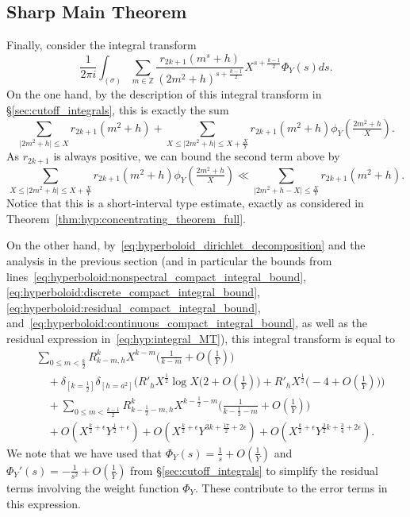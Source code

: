 \subsection{Sharp Main Theorem}


Finally, consider the integral transform
\begin{equation}
  \frac{1}{2\pi i} \int_{(\sigma)} \sum_{m \in \mathbb{Z}} \frac{r_{2k+1}{(m^s +
  h)}}{(2m^2 + h)^{s + \frac{k-1}{2}}} X^{s + \frac{k-1}{2}} \Phi_Y(s) ds.
\end{equation}
On the one hand, by the description of this integral transform in
\S\ref{sec:cutoff_integrals}, this is exactly the sum
\begin{equation}\label{eq:hyp:sharp_main_estimate_I}
  \sum_{\lvert 2m^2 + h \rvert \leq X} r_{2k+1}(m^2 + h) + \sum_{X \leq \lvert 2m^2+h
  \rvert \leq X+\frac{X}{Y}} r_{2k+1}(m^2+h) \phi_Y(\tfrac{2m^2+h}{X}).
\end{equation}
As $r_{2k+1}$ is always positive, we can bound the second term above by
\begin{equation}\label{eq:hyp:sharp_main_estimate_II}
  \sum_{X \leq \lvert 2m^2+h \rvert \leq X+\frac{X}{Y}} r_{2k+1}(m^2+h)
  \phi_Y(\tfrac{2m^2+h}{X}) \ll \sum_{\lvert 2m^2 + h - X \rvert \leq \frac{X}{Y}}
  r_{2k+1}(m^2 + h).
\end{equation}
Notice that this is a short-interval type estimate, exactly as considered in
Theorem~\ref{thm:hyp:concentrating_theorem_full}.


On the other hand, by~\eqref{eq:hyperboloid_dirichlet_decomposition} and the analysis in
the previous section (and in particular the bounds from
lines~\eqref{eq:hyperboloid:nonspectral_compact_integral_bound},
\eqref{eq:hyperboloid:discrete_compact_integral_bound},
\eqref{eq:hyperboloid:residual_compact_integral_bound},
and~\eqref{eq:hyperboloid:continuous_compact_integral_bound}, as well as the residual
expression in~\eqref{eq:hyp:integral_MT}), this integral
transform is equal to
\begin{align}
  &\sum_{0 \leq m < \frac{k}{2}} R_{k-m, h}^k X^{k-m} \big( \tfrac{1}{k-m} +
O(\tfrac{1}{Y}) \big) \\
  &\quad + \delta_{[k = \frac{1}{2}]} \delta_{[h = a^2]} \bigg( R'_h X^{\frac{1}{2}} \log
X \big(2 + O(\tfrac{1}{Y}) \big) + R'_h X^{\frac{1}{2}} \big( -4 + O(\tfrac{1}{Y}) \big)
\bigg) \\
  &\quad + \sum_{0 \leq m < \frac{k-1}{2}} R_{k - \frac{1}{2} - m,h}^k X^{k - \frac{1}{2}
- m} \big( \tfrac{1}{k - \frac{1}{2} - m} + O(\tfrac{1}{Y})\big) \\
  &\quad
  + O(X^{\frac{k}{2} + \epsilon} Y^{\frac{1}{2} + \epsilon})
  + O(X^{\frac{k}{2} + \epsilon} Y^{3k + \frac{17}{2} + 2\epsilon})
  + O(X^{\frac{k}{2} + \epsilon} Y^{\frac{3}{2}k + \frac{3}{4} + 2\epsilon}).
\end{align}
We note that we have used that $\Phi_Y(s) = \frac{1}{s} + O(\frac{1}{Y})$ and
$\Phi_Y'(s) = -\frac{1}{s^2} + O(\frac{1}{Y})$ from \S\ref{sec:cutoff_integrals}
to simplify the residual terms involving the weight function $\Phi_Y$.
These contribute to the error terms in this expression.




